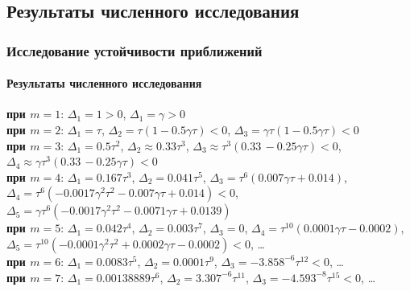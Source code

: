 \documentclass{beamer}
\numberwithin{equation}{section}
\begin{document}
    \subsection{Результаты численного исследования}
    \begin{frame}
        \frametitle{Исследование устойчивости приближений}
        \framesubtitle{Результаты численного исследования}

        \begin{small}

        \textbf{при $m=1$}: $\Delta_1 = 1 > 0$, $\Delta_1 = \gamma > 0$\\

        \textbf{при $m=2$}: $\Delta_1 = \tau$, $\Delta_2 = \tau (1 - 0.5 \gamma \tau) < 0$, $\Delta_3 = \gamma \tau (1 - 0.5 \gamma \tau) < 0$\\

        \textbf{при $m=3$}: $\Delta_1 = 0.5 \tau ^2$, $\Delta_2 \approx 0.33 \tau ^3$, $\Delta_3 \approx \tau ^3 (0.33\, -0.25 \gamma  \tau ) < 0$, $\Delta_4 \approx \gamma  \tau ^3 (0.33\, -0.25 \gamma  \tau ) < 0$\\

        \textbf{при $m=4$}: $\Delta_1 = 0.167 \tau ^3$, $\Delta_2 = 0.041 \tau ^5$, $\Delta_3 = \tau ^6 (0.007 \gamma  \tau + 0.014)$, \\$\Delta_4 = \tau ^6 \left(-0.0017 \gamma ^2 \tau ^2-0.007 \gamma  \tau +0.014\right) < 0$, $\Delta_5 = \gamma  \tau ^6 \left(-0.0017 \gamma ^2 \tau ^2-0.0071 \gamma  \tau +0.0139 \right)$\\

        \textbf{при $m=5$}: $\Delta_1 = 0.042 \tau ^4$, $\Delta_2 = 0.003 \tau ^7$, $\Delta_3 = 0$, $\Delta_4 = \tau ^{10} (0.0001 \gamma  \tau -0.0002)$, $\Delta_5 = \tau ^{10} \left(-0.0001 \gamma ^2 \tau ^2+0.0002 \gamma  \tau -0.0002\right) < 0$, \dots\\

        \textbf{при $m=6$}: $\Delta_1 = 0.0083 \tau ^5$, $\Delta_2 = 0.0001 \tau ^9$, $\Delta_3 = -3.858^{-6} \tau ^{12} < 0$, \dots\\

        \textbf{при $m=7$}: $\Delta_1 = 0.00138889 \tau ^6$, $\Delta_2 = 3.307^{-6} \tau ^{11}$, $\Delta_3 = -4.593^{-8} \tau ^{15} < 0$, \dots\\

        \end{small}

    \end{frame}
\end{document}
